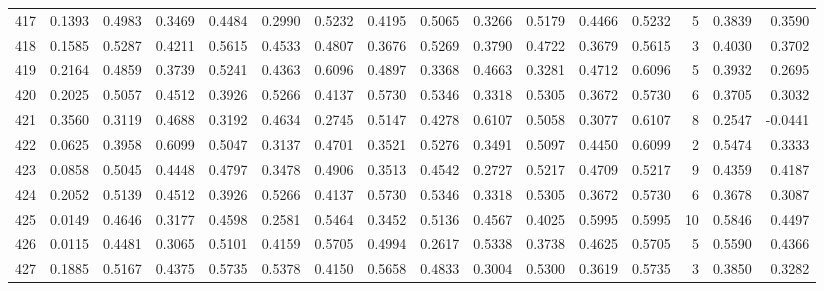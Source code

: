 \begin{tabular}{lrrrrrrrrrrrrrrr}
417 &      0.1393 &  0.4983 &  0.3469 &  0.4484 &  0.2990 &  0.5232 &  0.4195 &  0.5065 &  0.3266 &  0.5179 &   0.4466 &     0.5232 &      5 &                    0.3839 &                     0.3590 \\
418 &      0.1585 &  0.5287 &  0.4211 &  0.5615 &  0.4533 &  0.4807 &  0.3676 &  0.5269 &  0.3790 &  0.4722 &   0.3679 &     0.5615 &      3 &                    0.4030 &                     0.3702 \\
419 &      0.2164 &  0.4859 &  0.3739 &  0.5241 &  0.4363 &  0.6096 &  0.4897 &  0.3368 &  0.4663 &  0.3281 &   0.4712 &     0.6096 &      5 &                    0.3932 &                     0.2695 \\
420 &      0.2025 &  0.5057 &  0.4512 &  0.3926 &  0.5266 &  0.4137 &  0.5730 &  0.5346 &  0.3318 &  0.5305 &   0.3672 &     0.5730 &      6 &                    0.3705 &                     0.3032 \\
421 &      0.3560 &  0.3119 &  0.4688 &  0.3192 &  0.4634 &  0.2745 &  0.5147 &  0.4278 &  0.6107 &  0.5058 &   0.3077 &     0.6107 &      8 &                    0.2547 &                    -0.0441 \\
422 &      0.0625 &  0.3958 &  0.6099 &  0.5047 &  0.3137 &  0.4701 &  0.3521 &  0.5276 &  0.3491 &  0.5097 &   0.4450 &     0.6099 &      2 &                    0.5474 &                     0.3333 \\
423 &      0.0858 &  0.5045 &  0.4448 &  0.4797 &  0.3478 &  0.4906 &  0.3513 &  0.4542 &  0.2727 &  0.5217 &   0.4709 &     0.5217 &      9 &                    0.4359 &                     0.4187 \\
424 &      0.2052 &  0.5139 &  0.4512 &  0.3926 &  0.5266 &  0.4137 &  0.5730 &  0.5346 &  0.3318 &  0.5305 &   0.3672 &     0.5730 &      6 &                    0.3678 &                     0.3087 \\
425 &      0.0149 &  0.4646 &  0.3177 &  0.4598 &  0.2581 &  0.5464 &  0.3452 &  0.5136 &  0.4567 &  0.4025 &   0.5995 &     0.5995 &     10 &                    0.5846 &                     0.4497 \\
426 &      0.0115 &  0.4481 &  0.3065 &  0.5101 &  0.4159 &  0.5705 &  0.4994 &  0.2617 &  0.5338 &  0.3738 &   0.4625 &     0.5705 &      5 &                    0.5590 &                     0.4366 \\
427 &      0.1885 &  0.5167 &  0.4375 &  0.5735 &  0.5378 &  0.4150 &  0.5658 &  0.4833 &  0.3004 &  0.5300 &   0.3619 &     0.5735 &      3 &                    0.3850 &                     0.3282 \\

\end{tabular}
